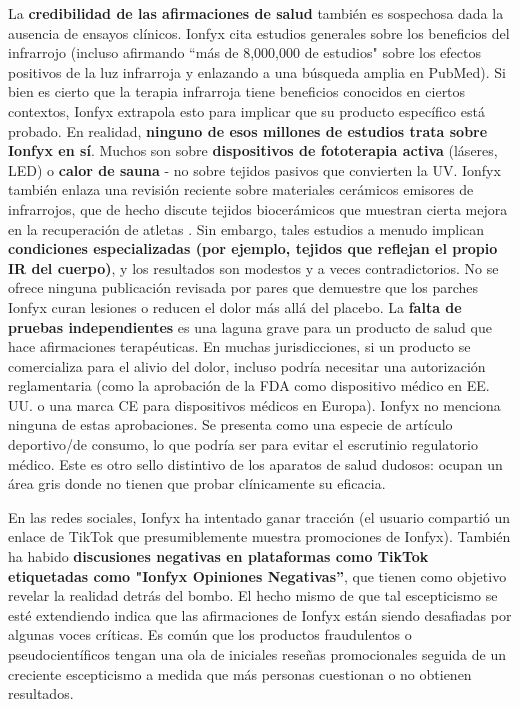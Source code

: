 \documentclass{article}
\begin{document}
La \textbf{credibilidad de las afirmaciones de salud} también es sospechosa dada la ausencia de ensayos clínicos. Ionfyx cita estudios generales sobre los beneficios del infrarrojo (incluso afirmando “más de 8,000,000 de estudios" sobre los efectos positivos de la luz infrarroja y enlazando a una búsqueda amplia en PubMed). Si bien es cierto que la terapia infrarroja tiene beneficios conocidos en ciertos contextos, Ionfyx extrapola esto para implicar que su producto específico está probado. En realidad, \textbf{ninguno de esos millones de estudios trata sobre Ionfyx en sí}. Muchos son sobre \textbf{dispositivos de fototerapia activa} (láseres, LED) o \textbf{calor de sauna} - no sobre tejidos pasivos que convierten la UV. Ionfyx también enlaza una revisión reciente sobre materiales cerámicos emisores de infrarrojos, que de hecho discute tejidos biocerámicos que muestran cierta mejora en la recuperación de atletas \cite{ceramic_infrared_pmc}. Sin embargo, tales estudios a menudo implican \textbf{condiciones especializadas (por ejemplo, tejidos que reflejan el propio IR del cuerpo)}, y los resultados son modestos y a veces contradictorios. No se ofrece ninguna publicación revisada por pares que demuestre que los parches Ionfyx curan lesiones o reducen el dolor más allá del placebo. La \textbf{falta de pruebas independientes} es una laguna grave para un producto de salud que hace afirmaciones terapéuticas. En muchas jurisdicciones, si un producto se comercializa para el alivio del dolor, incluso podría necesitar una autorización reglamentaria (como la aprobación de la FDA como dispositivo médico en EE. UU. o una marca CE para dispositivos médicos en Europa). Ionfyx no menciona ninguna de estas aprobaciones. Se presenta como una especie de artículo deportivo/de consumo, lo que podría ser para evitar el escrutinio regulatorio médico. Este es otro sello distintivo de los aparatos de salud dudosos: ocupan un área gris donde no tienen que probar clínicamente su eficacia.

En las redes sociales, Ionfyx ha intentado ganar tracción (el usuario compartió un enlace de TikTok que presumiblemente muestra promociones de Ionfyx). También ha habido \textbf{discusiones negativas en plataformas como TikTok etiquetadas como "Ionfyx Opiniones Negativas”}, que tienen como objetivo revelar la realidad detrás del bombo. El hecho mismo de que tal escepticismo se esté extendiendo indica que las afirmaciones de Ionfyx están siendo desafiadas por algunas voces críticas. Es común que los productos fraudulentos o pseudocientíficos tengan una ola de iniciales reseñas promocionales seguida de un creciente escepticismo a medida que más personas cuestionan o no obtienen resultados.
\end{document}
